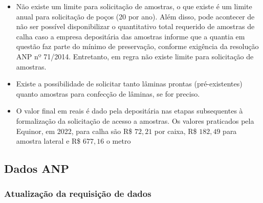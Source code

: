 \documentclass[aspectratio=169]{beamer} %
\begin{document}
{{\begin{frame}
	\begin{itemize}
		\item Não existe um limite para solicitação de amostras, o que existe é um limite anual para solicitação de poços (20 por ano). Além disso, pode acontecer de não ser possível disponibilizar o quantitativo total requerido de amostras de calha caso a empresa depositária das amostras informe que a quantia em questão faz parte do mínimo de preservação, conforme exigência da resolução ANP nº 71/2014. Entretanto, em regra não existe limite para solicitação de amostras.
		\pause
		\item Existe a possibilidade de solicitar tanto lâminas prontas (pré-existentes) quanto amostras para confecção de lâminas, se for preciso.
        \pause
		\item O valor final em reais é dado pela depositária nas etapas subsequentes à formalização da solicitação de acesso a amostras. Os valores praticados pela Equinor, em 2022, para calha são R\$ $72,21$ por caixa, R\$ $182,49$ para amostra lateral e R\$ $677,16$ o metro 
	\end{itemize}
\end{frame} 
}



\subsection{Dados ANP}

{
\begin{frame}
	\frametitle{Atualização da requisição de dados}


\end{frame}}}
\end{document}
